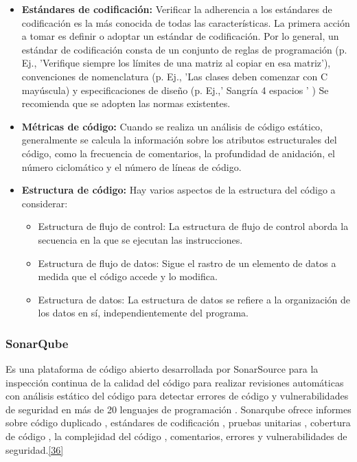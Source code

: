 \begin{itemize}
	\item \textbf {Estándares de codificación:} Verificar la adherencia a los estándares de codificación es la más conocida de todas las características. La primera acción a tomar es definir o adoptar un estándar de codificación. Por lo general, un estándar de codificación consta de un conjunto de reglas de programación (p. Ej., 'Verifique siempre los límites de una matriz al copiar en esa matriz'), convenciones de nomenclatura (p. Ej., 'Las clases deben comenzar con C mayúscula) y especificaciones de diseño (p. Ej.,' Sangría 4 espacios ' ) Se recomienda que se adopten las normas existentes. 
	\item \textbf {Métricas de código:} Cuando se realiza un análisis de código estático, generalmente se calcula la información sobre los atributos estructurales del código, como la frecuencia de comentarios, la profundidad de anidación, el número ciclomático y el número de líneas de código.
	\item \textbf {Estructura de código:} 
	 Hay varios aspectos de la estructura del código a considerar:
	\begin{itemize}
		\item Estructura de flujo de control: La estructura de flujo de control aborda la secuencia en la que se ejecutan las instrucciones.
		\item Estructura de flujo de datos: Sigue el rastro de un elemento de datos a medida que el código accede y lo modifica.
		\item Estructura de datos: La estructura de datos se refiere a la organización de los datos en sí, independientemente del programa.
	\end{itemize}
\end{itemize}

\subsubsection{SonarQube }

Es una plataforma de código abierto desarrollada por SonarSource para la inspección continua de la calidad del código para realizar revisiones automáticas con análisis estático del código para detectar errores de código y vulnerabilidades de seguridad en más de 20 lenguajes de programación . Sonarqube ofrece informes sobre código duplicado , estándares de codificación , pruebas unitarias , cobertura de código , la complejidad del código , comentarios, errores y vulnerabilidades de seguridad.\hyperlink{b36}{[36]}\\

